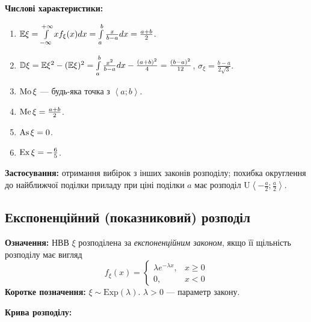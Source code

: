 \noindent\textbf{Числові характеристики:}
\begin{enumerate}
    \item $\mathbb{E}\xi = \int\limits_{-\infty}^{+\infty} x f_\xi(x)dx = \int\limits_{a}^{b} \frac{x}{b-a}dx = \frac{a+b}{2}$.
    \item $\mathbb{D}\xi = \mathbb{E}\xi^2 - (\mathbb{E}\xi)^2 = \int\limits_{a}^{b} \frac{x^2}{b-a}dx - \frac{(a+b)^2}{4} = \frac{(b-a)^2}{12}$, $\sigma_\xi = \frac{b-a}{2\sqrt{3}}$.
    \item $\operatorname{Mo}\xi$ --- будь-яка точка з $\left<a; b\right>$.
    \item $\operatorname{Me}\xi = \frac{a+b}{2}$.
    \item $\operatorname{As}\xi = 0$.
    \item $\operatorname{Ex}\xi = -\frac{6}{5}$.
\end{enumerate}

\noindent\textbf{Застосування:} отримання вибірок з інших законів розподілу;
похибка округлення до найближчої поділки приладу при ціні поділки $a$ має розподіл $\mathrm{U}\left<-\frac{a}{2}; \frac{a}{2}\right>$.

\subsection{Експоненційний (показниковий) розподіл}
\noindent\textbf{Означення:}
    НВВ $\xi$ розподілена за \emph{експоненційним законом}, 
    якщо її щільність розподілу має вигляд \begin{equation}
        f_\xi(x) = \begin{cases}
            \lambda e^{-\lambda x}, & x \geq 0 \\
            0, & x < 0
        \end{cases}
    \end{equation}
\textbf{Коротке позначення:} $\xi \sim \mathrm{Exp}(\lambda)$.
    $\lambda > 0$ --- параметр закону.

\noindent \textbf{Крива розподілу:}
\begin{center}
\end{center}


